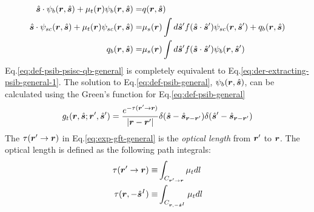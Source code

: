 \documentclass [10pt,letterpaper]{article}
\renewcommand{\vec}{\vectorsym}
\newcommand{\unitvec}[1]{\hat{\vec{#1}}}
\begin{document}
\begin{subequations} \label{eq:def-psib-psisc-qb-general}
	\begin{align} 
		\unitvec{s}
		\cdot
		\psi_b(\vec{r},\unitvec{s})
		+
		\mu_t(\vec{r})
		\psi_b(\vec{r},\unitvec{s})
		=&
		q(\vec{r},\unitvec{s})
		\label{eq:def-psib-general}
		\\ 
		\unitvec{s}
		\cdot
		\psi_{sc}(\vec{r},\unitvec{s})
		+
		\mu_t(\vec{r})
		\psi_{sc}(\vec{r},\unitvec{s})
		=&
		\mu_s(\vec{r})
		\int d\unitvec{s}^\prime
		f(\unitvec{s}\cdot\unitvec{s}^\prime)
		\psi_{sc}(\vec{r},\unitvec{s}^\prime) 
		+
		q_b(\vec{r},\unitvec{s})
		\label{eq:def-psisc-general}
		\\
		q_b(\vec{r},\unitvec{s})
		=&
		\mu_s(\vec{r})
		\int d\unitvec{s}^\prime
		f(\unitvec{s}\cdot\unitvec{s}^\prime)
		\psi_{b}(\vec{r},\unitvec{s}^\prime) 
		\label{eq:def-qb-general}
	\end{align}
\end{subequations}
Eq.\eqref{eq:def-psib-psisc-qb-general} is completely equivalent to Eq.\eqref{eq:der-extracting-psib-general-1}.
The solution to Eq.\eqref{eq:def-psib-general}, $\psi_b(\vec{r},\unitvec{s})$, can be calculated using the Green's function for Eq.\eqref{eq:def-psib-general}
\begin{equation} \label{eq:exp-gft-general}
	g_t(\vec{r},\unitvec{s};\vec{r}^\prime,\unitvec{s}^\prime)
	=
	\frac
	{e^{-\tau(\vec{r}^\prime\to\vec{r})}}
	{\lvert \vec{r}-\vec{r}^\prime \rvert}
	\delta(\unitvec{s}-\unitvec{s}_{\vec{r}-\vec{r}^\prime})
	\delta(\unitvec{s}^\prime-\unitvec{s}_{\vec{r}-\vec{r}^\prime})
\end{equation}
The $\tau(\vec{r}^\prime\to\vec{r})$ in Eq.\eqref{eq:exp-gft-general} is the \emph{optical length} from $\vec{r}^\prime$ to $\vec{r}$.
The optical length is defined as the following path integrals:
\begin{subequations} \label{eq:def-optical-length-general}
	\begin{align}
		\tau(\vec{r}^\prime\to\vec{r})
		\equiv
		&
		\int_{
			C_{\vec{r}^\prime\to\vec{r}}
		}
		\mu_t
		dl
		\label{eq:def-optical-length-rp-to-r}
		\\
		\tau(\vec{r},-\unitvec{s}^I)
		\equiv
		&
		\int_{
			C_{\vec{r},-\unitvec{s}^I}
		}
		\mu_t
		dl
		\label{eq:def-optical-length-rp-sI}
	\end{align}
\end{subequations}
\end{document}
